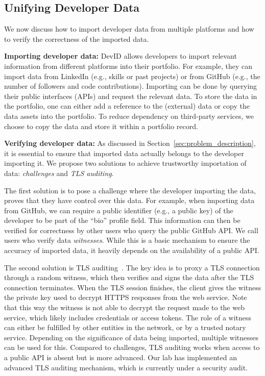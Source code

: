 \subsection{Unifying Developer Data}
\label{subsec:unifying_data}
We now discuss how to import developer data from multiple platforms and how to verify the correctness of the imported data.

\textbf{Importing developer data:}
DevID allows developers to import relevant information from different platforms into their portfolio.
For example, they can import data from LinkedIn (e.g., skills or past projects) or from GitHub (e.g., the number of followers and code contributions).
Importing can be done by querying their public interfaces (APIs) and request the relevant data.
To store the data in the portfolio, one can either add a reference to the (external) data or copy the data assets into the portfolio.
To reduce dependency on third-party services, we choose to copy the data and store it within a portfolio record.

\textbf{Verifying developer data:}
As discussed in Section~\ref{sec:problem_description}, it is essential to ensure that imported data actually belongs to the developer importing it.
We propose two solutions to achieve trustworthy importation of data: \textit{challenges} and \textit{TLS auditing}.

The first solution is to pose a challenge where the developer importing the data, proves that they have control over this data.
For example, when importing data from GitHub, we can require a public identifier (e.g., a public key) of the developer to be part of the \enquote{bio} profile field.
This information can then be verified for correctness by other users who query the public GitHub API.
We call users who verify data \emph{witnesses}.
While this is a basic mechanism to ensure the accuracy of imported data, it heavily depends on the availability of a public API.

The second solution is TLS auditing~\cite{tlsnotary2014whitepaper}.
The key idea is to proxy a TLS connection through a random witness, which then verifies and signs the data after the TLS connection terminates.
When the TLS session finishes, the client gives the witness the private key used to decrypt HTTPS responses from the web service.
Note that this way the witness is not able to decrypt the request made to the web service, which likely includes credentials or access tokens.
The role of a witness can either be fulfilled by other entities in the network, or by a trusted notary service.
Depending on the significance of data being imported, multiple witnesses can be used for this.
Compared to challenges, TLS auditing works when access to a public API is absent but is more advanced.
Our lab has implemented an advanced TLS auditing mechanism, which is currently under a security audit.


